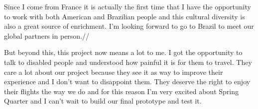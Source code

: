 Since I come from France it is actually the first time that I have the opportunity to work with both American and Brazilian people and this cultural diversity is also a great source of enrichment. I’m looking forward to go to Brazil to meet our global partners in person.//

But beyond this, this project now means a lot to me. I got the opportunity to talk to disabled people and understood how painful it is for them to travel. They care a lot about our project because they see it as way to improve their experience and I don’t want to disappoint them. They deserve the right to enjoy their flights the way we do and for this reason I’m very excited about Spring Quarter and I can’t wait to build our final prototype and test it.